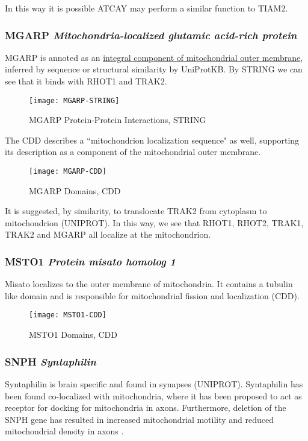 In this way it is possible ATCAY may perform a similar function to TIAM2.

\subsubsection{MGARP \textit{Mitochondria-localized glutamic acid-rich protein}}

MGARP is annoted as an
\href{http://www.ebi.ac.uk/QuickGO/GTerm?id=GO:0031307}{integral component of
mitochondrial outer membrane}, inferred by sequence or structural similarity by
UniProtKB. By STRING we can see that it binds with RHOT1 and TRAK2.

\begin{figure}[h]
  \centering
  \texttt{[image: MGARP-STRING]}
  \caption{MGARP Protein-Protein Interactions, STRING}
\end{figure}

The CDD describes a ``mitochondrion localization sequence" as well, supporting
its description as a component of the mitochondrial outer membrane.

\begin{figure}[h]
  \texttt{[image: MGARP-CDD]}
  \caption{MGARP Domains, CDD}
\end{figure}

It is suggested, by similarity, to translocate TRAK2 from cytoplasm to
mitochondrion (UNIPROT). In this way, we see that RHOT1, RHOT2, TRAK1, TRAK2 and
MGARP all localize at the mitochondrion.

\subsubsection{MSTO1 \textit{Protein misato homolog 1}}

Misato localizes to the outer membrane of mitochondria. It contains a tubulin
like domain and is responsible for mitochondrial fission and localization (CDD).

\begin{figure}[h]
  \texttt{[image: MSTO1-CDD]}
  \caption{MSTO1 Domains, CDD}
\end{figure}

\subsubsection{SNPH \textit{Syntaphilin}}

Syntaphilin is brain specific and found in synapses (UNIPROT). Syntaphilin
has been found co-localized with mitochondria, where it has been proposed
to act as receptor for docking for mitochondria in axons. Furthermore, deletion
of the SNPH gene has resulted in increased mitochondrial motility and reduced
mitochondrial density in axons \citep{Reis2009}.


